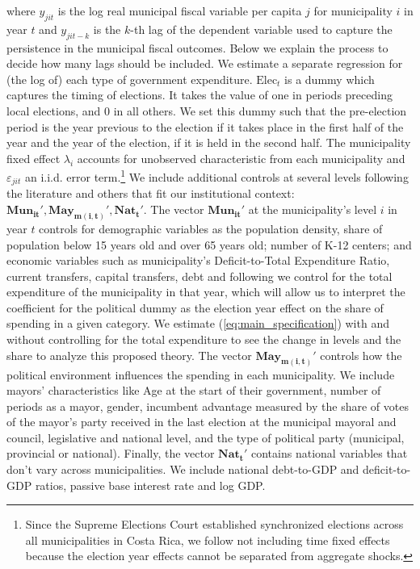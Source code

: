 where $y_{jit}$ is the log real municipal fiscal variable per capita $j$ for municipality $i$ in year $t$ and $y_{jit-k}$ is the $k$-th lag of the dependent variable used to capture the persistence in the municipal fiscal outcomes. Below we explain the process to decide how many lags should be included. We estimate a separate regression for (the log of) each type of government expenditure. $\text{Elec}_t$ is a dummy which captures the timing of elections. It takes the value of one in periods preceding local elections, and 0 in all others. We set this dummy such that the pre-election period is the year previous to the election if it takes place in the first half of the year and the year of the election, if it is held in the second half. The municipality fixed effect $\lambda_i$ accounts for unobserved characteristic from each municipality and $\varepsilon_{jit}$ an i.i.d. error term.\footnote{Since the Supreme Elections Court established synchronized elections across all municipalities in Costa Rica, we follow \textcite{chortareas2016} not including time fixed effects because the election year effects cannot be separated from aggregate shocks. }  We include additional controls at several levels following the literature and others that fit our institutional context: $\mathbf{Mun_{it}'},\mathbf{May_{m(i,t)}'},\mathbf{Nat_{t}'}$. The vector $\mathbf{Mun_{it}'}$ at the municipality's level $i$ in year $t$ controls for demographic variables as the population density, share of population below 15 years old and over 65 years old; number of K-12 centers; and economic variables such as municipality's Deficit-to-Total Expenditure Ratio, current transfers, capital transfers, debt and following \textcite{drazen2010} we control for the total expenditure of the municipality in that year, which will allow us to interpret the coefficient for the political dummy as the election year effect on the share of spending in a given category. We estimate (\ref{eq:main_specification}) with and without controlling for the total expenditure to see the change in levels and the share to analyze this proposed theory. The vector $\mathbf{May_{m(i,t)}'}$ controls how the political environment influences the spending in each municipality. We include mayors' characteristics like Age at the start of their government, number of periods as a mayor, gender, incumbent advantage measured by the share of votes of the mayor's party received in the last election at the municipal mayoral and council, legislative and national level, and the type of political party (municipal, provincial or national). Finally, the vector $\mathbf{Nat_{t}'}$ contains national variables that don't vary across municipalities. We include national debt-to-GDP and deficit-to-GDP ratios, passive base interest rate and log GDP. 

